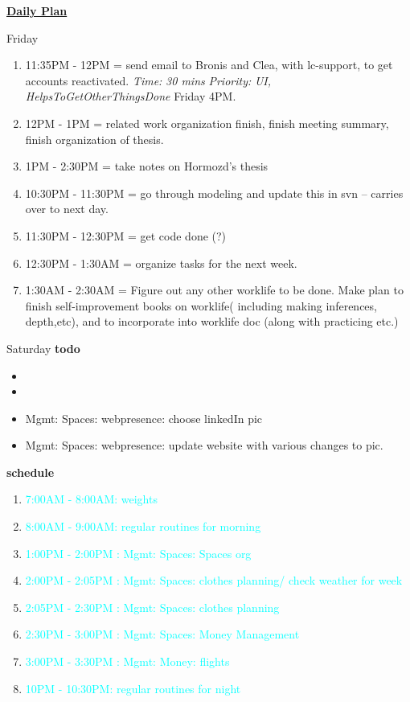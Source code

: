 \documentclass[serif,mathserif,final]{beamer}
\newcommand{\timeEst}[1]{\textit{Time:} \textit{#1}}
\newcommand{\priority}[1]{\textit{Priority:} \textit{#1}}
\newcommand{\regItem}[1]{\item \textcolor{cyan}{#1}}
\newcommand{\deadline}[1]{#1}
\begin{document}
\begin{frame}{}
\begin{columns}[t]
\begin{column}{0.33\linewidth}{\textbf{\underline{Daily Plan}}}
{\begin{block}{\small Friday}
\begin{enumerate}
   \item \tiny 11:35PM - 12PM = send email to Bronis and Clea, with lc-support, to get accounts reactivated. \timeEst{30 mins} \priority{UI, HelpsToGetOtherThingsDone} \deadline{Friday 4PM}. 
   \item \tiny 12PM - 1PM  = related work organization finish, finish meeting summary, finish organization of thesis. 
   \item \tiny 1PM - 2:30PM = take notes on Hormozd's thesis
   \item \tiny 10:30PM - 11:30PM = go through modeling and update this in svn -- carries over to next day.
   \item \tiny 11:30PM - 12:30PM =  get code done (?) 
   \item \tiny 12:30PM - 1:30AM = organize tasks for the next week.
     
   \item \tiny 1:30AM - 2:30AM = Figure out any other worklife to be done. Make plan to finish self-improvement books on worklife(
     including making inferences, depth,etc), and to incorporate into worklife doc (along with practicing etc.) 

\end{enumerate} 
\end{block}

\begin{block}{\small Saturday } 
  \textbf{todo} 
  \begin{itemize} 
  \item \tiny 
  \item \tiny
\item \tiny Mgmt: Spaces: webpresence: choose linkedIn pic 
\item \tiny Mgmt: Spaces: webpresence: update website with various changes to pic. 
  \end{itemize} 

  \textbf{schedule} 
  \begin{enumerate} 
    \regItem{7:00AM - 8:00AM: weights}
    \regItem{8:00AM - 9:00AM: regular routines for morning} 

    \regItem{ \tiny  1:00PM - 2:00PM : Mgmt: Spaces: Spaces org} 
    \regItem{\tiny  2:00PM - 2:05PM : Mgmt: Spaces: clothes planning/ check weather for week} 
    \regItem{\tiny  2:05PM - 2:30PM : Mgmt: Spaces: clothes planning} 
    \regItem{ \tiny  2:30PM - 3:00PM :  Mgmt: Spaces: Money Management }
    \regItem{ \tiny  3:00PM - 3:30PM : Mgmt: Money: flights} 
    \regItem{10PM  - 10:30PM: regular routines for night}
  \end{enumerate} 


\end{block}}
\end{column}
\end{columns}
\end{frame}
\end{document}
